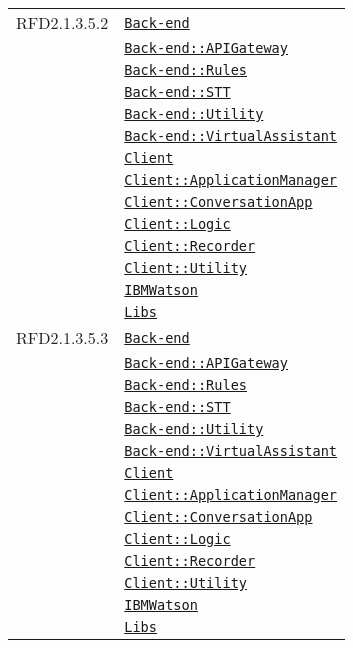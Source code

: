\begin{longtable}{|>{\centering}m{3cm}|m{10cm}<{\centering}|}
RFD2.1.3.5.2 & \hyperref[Back-end]{\texttt{Back-end}}\\
& \hyperref[Back-end::APIGateway]{\texttt{Back-end::APIGateway}}\\
& \hyperref[Back-end::Rules]{\texttt{Back-end::Rules}}\\
& \hyperref[Back-end::STT]{\texttt{Back-end::STT}}\\
& \hyperref[Back-end::Utility]{\texttt{Back-end::Utility}}\\
& \hyperref[Back-end::VirtualAssistant]{\texttt{Back-end::VirtualAssistant}}\\
& \hyperref[Client]{\texttt{Client}}\\
& \hyperref[Client::ApplicationManager]{\texttt{Client::ApplicationManager}}\\
& \hyperref[Client::ConversationApp]{\texttt{Client::ConversationApp}}\\
& \hyperref[Client::Logic]{\texttt{Client::Logic}}\\
& \hyperref[Client::Recorder]{\texttt{Client::Recorder}}\\
& \hyperref[Client::Utility]{\texttt{Client::Utility}}\\
& \hyperref[IBMWatson]{\texttt{IBMWatson}}\\
& \hyperref[Libs]{\texttt{Libs}}\\ \hline

RFD2.1.3.5.3 & \hyperref[Back-end]{\texttt{Back-end}}\\
& \hyperref[Back-end::APIGateway]{\texttt{Back-end::APIGateway}}\\
& \hyperref[Back-end::Rules]{\texttt{Back-end::Rules}}\\
& \hyperref[Back-end::STT]{\texttt{Back-end::STT}}\\
& \hyperref[Back-end::Utility]{\texttt{Back-end::Utility}}\\
& \hyperref[Back-end::VirtualAssistant]{\texttt{Back-end::VirtualAssistant}}\\
& \hyperref[Client]{\texttt{Client}}\\
& \hyperref[Client::ApplicationManager]{\texttt{Client::ApplicationManager}}\\
& \hyperref[Client::ConversationApp]{\texttt{Client::ConversationApp}}\\
& \hyperref[Client::Logic]{\texttt{Client::Logic}}\\
& \hyperref[Client::Recorder]{\texttt{Client::Recorder}}\\
& \hyperref[Client::Utility]{\texttt{Client::Utility}}\\
& \hyperref[IBMWatson]{\texttt{IBMWatson}}\\
& \hyperref[Libs]{\texttt{Libs}}\\ \hline


\end{longtable}
